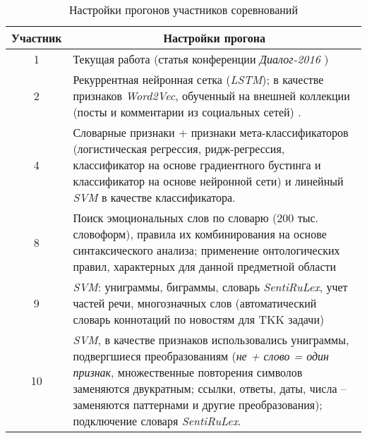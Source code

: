 \begin{table}[htp!]
\centering
\caption{Настройки прогонов участников соревнований}
\label{table:participants}
\begin{tabular}{cp{13.2cm}}
\hline
Участник        & \multicolumn{1}{|c}{Настройки прогона}                                                                                                                                                                                                                     \\ \hline
1               & Текущая работа (статья конференции {\it Диалог-2016} \cite{myArticle})                                                                                                                                                                                                        \\
2               & Рекуррентная нейронная сетка ({\it LSTM}); в качестве признаков {\it Word2Vec}, обученный на внешней коллекции (посты и комментарии из социальных сетей) \cite{neuralNetworks}.                                                                                                                                            \\
4               & Словарные признаки + признаки мета-классификаторов (логистическая регрессия, ридж-регрессия, классификатор на основе градиентного бустинга и классификатор на основе нейронной сети) и линейный {\it SVM} в качестве классификатора.                                                                 \\
8               & Поиск эмоциональных слов по словарю (200 тыс. словоформ), правила их комбинирования на основе синтаксического анализа; применение онтологических правил, характерных для данной предметной области                                                                                                  \\
9               & {\it SVM}: униграммы, биграммы, словарь {\it SentiRuLex}, учет частей речи, многозначных слов (автоматический словарь коннотаций по новостям для TKK задачи)                                                                                                                                         \\
10              & {\it SVM}, в качестве признаков использовались униграммы, подвергшиеся преобразованиям ({\it не + слово = один признак}, множественные повторения символов заменяются двукратным; ссылки, ответы, даты, числа – заменяются паттернами и другие преобразования); подключение словаря {\it SentiRuLex}.\\ \hline
\end{tabular}
\end{table}

